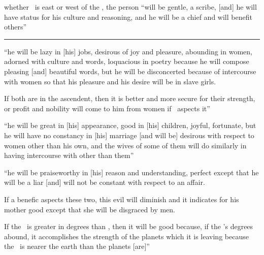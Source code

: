 \begin{description}[style=multiline,leftmargin=1.5cm]
\item[\Sun,\Mercury]
whether \Mercury\, is east or west of the \Sun, the person ``will be gentle, a scribe, [and] he will have status for his culture and reasoning, and he will be a chief and will benefit others''

\vspace{0.5em}\hrule
\item[\Venus,\Mercury]
``he will be lazy in [his] jobs, desirous of joy and pleasure, abounding in women, adorned with culture and words, loquacious in poetry because he will compose pleasing [and] beautiful words, but he will be disconcerted because of intercourse with women so that his pleasure and his desire will be in slave girls.

If both are in the ascendent, then it is better and more secure for their strength, or profit and nobility will come to him from women if \Jupiter\, aspects it''

\item[\Venus,\Moon]
``he will be great in [his] appearance, good in [his] children, joyful, fortunate, but he will have no constancy in [his] marriage [and will be] desirous with respect to women other than his own, and the wives of some of them will do similarly in having intercourse with other than them''

\item[\Mercury,\Moon]
``he will be praiseworthy in [his] reason and understanding, perfect except that he will be a liar [and] will not be constant with respect to an affair.

If a benefic aspects these two, this evil will diminish and it indicates for his mother good except that she will be disgraced by men.

If the \Moon\, is greater in degrees than \Mercury, then it will be good because, if the \Moon's degrees abound, it accomplishes the strength of the planets which it is leaving because the \Moon\, is nearer the earth than the planets [are]''

\end{description}